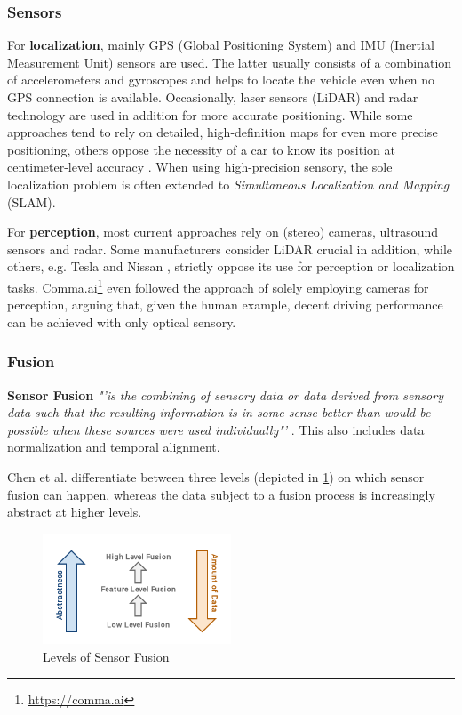 \subsubsection{Sensors}
For \textbf{localization}, mainly GPS (Global Positioning System) and IMU (Inertial Measurement Unit) sensors are used. The latter usually consists of a combination of accelerometers and gyroscopes and helps to locate the vehicle even when no GPS connection is available. Occasionally, laser sensors (LiDAR) and radar technology are used in addition for more accurate positioning. While some approaches tend to rely on detailed, high-definition maps for even more precise positioning, others oppose the necessity of a car to know its position at centimeter-level accuracy \cite{Friedman2019}. When using high-precision sensory, the sole localization problem is often extended to \textit{Simultaneous Localization and Mapping} (SLAM).

For \textbf{perception}, most current approaches rely on (stereo) cameras, ultrasound sensors and radar. Some manufacturers consider LiDAR crucial in addition, while others, e.g. Tesla and Nissan \cite{McKinseyCenterforFutureMobility2019}, strictly oppose its use for perception or localization tasks. Comma.ai\footnote{\url{https://comma.ai}} even followed the approach of solely employing cameras for perception, arguing that, given the human example, decent driving performance can be achieved with only optical sensory. 

\subsubsection{Fusion}
\textbf{Sensor Fusion} \textit{"'is the combining of sensory data or data derived from sensory data such that the resulting information is in some sense better than would be possible when these sources were used individually"'} \cite{Elmenreich2002}. This also includes data normalization and temporal alignment.

Chen et al. \cite{Chen2019} differentiate between three levels (depicted in \cref{fig:fusion_levels}) on which sensor fusion can happen, whereas the data subject to a fusion process is increasingly abstract at higher levels. 

\begin{figure}[H]
	\centering
	\includegraphics[width=0.5\textwidth]{98_images/fusion_levels.png}
	\caption{Levels of Sensor Fusion}
	\label{fig:fusion_levels}
\end{figure}

